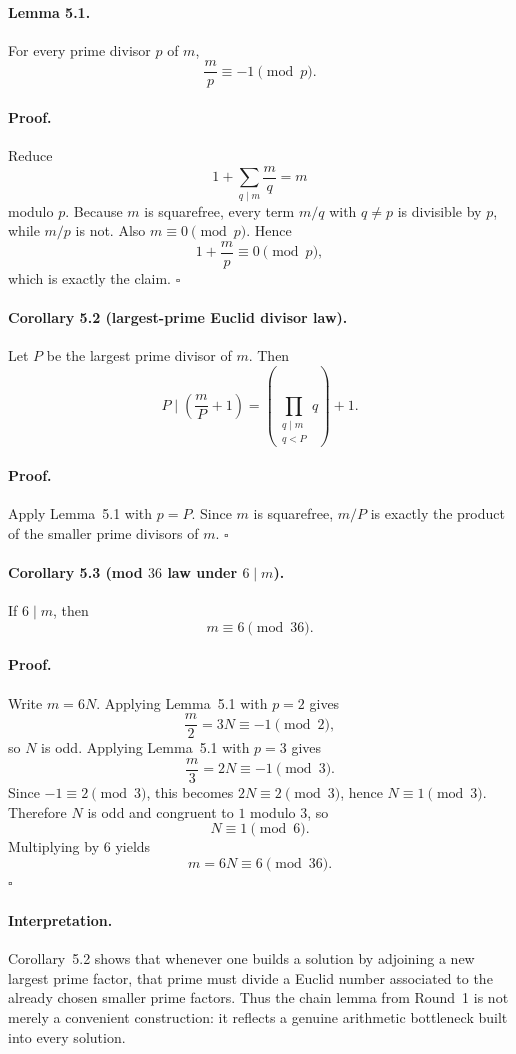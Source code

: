 \paragraph{Lemma 5.1.}
For every prime divisor $p$ of $m$,
\[
\frac{m}{p}\equiv -1 \pmod p.
\]

\paragraph{Proof.}
Reduce
\[
1+\sum_{q\mid m}\frac{m}{q}=m
\]
modulo $p$.  Because $m$ is squarefree, every term $m/q$ with $q\neq p$ is divisible by $p$, while $m/p$ is not.  Also $m\equiv 0\pmod p$.  Hence
\[
1+\frac{m}{p}\equiv 0 \pmod p,
\]
which is exactly the claim.  \hfill $\square$

\paragraph{Corollary 5.2 (largest-prime Euclid divisor law).}
Let $P$ be the largest prime divisor of $m$.  Then
\[
P\mid \left(\frac{m}{P}+1\right)=\left(\prod_{\substack{q\mid m \\ q<P}} q\right)+1.
\]

\paragraph{Proof.}
Apply Lemma~5.1 with $p=P$.  Since $m$ is squarefree, $m/P$ is exactly the product of the smaller prime divisors of $m$.  \hfill $\square$

\paragraph{Corollary 5.3 (mod $36$ law under $6\mid m$).}
If $6\mid m$, then
\[
m\equiv 6 \pmod{36}.
\]

\paragraph{Proof.}
Write $m=6N$.
Applying Lemma~5.1 with $p=2$ gives
\[
\frac{m}{2}=3N\equiv -1 \pmod 2,
\]
so $N$ is odd.
Applying Lemma~5.1 with $p=3$ gives
\[
\frac{m}{3}=2N\equiv -1 \pmod 3.
\]
Since $-1\equiv 2\pmod 3$, this becomes $2N\equiv 2\pmod 3$, hence $N\equiv 1\pmod 3$.
Therefore $N$ is odd and congruent to $1$ modulo $3$, so
\[
N\equiv 1 \pmod 6.
\]
Multiplying by $6$ yields
\[
m=6N\equiv 6 \pmod{36}.
\]
\hfill $\square$

\paragraph{Interpretation.}
Corollary~5.2 shows that whenever one builds a solution by adjoining a new largest prime factor, that prime must divide a Euclid number associated to the already chosen smaller prime factors.  Thus the chain lemma from Round~1 is not merely a convenient construction: it reflects a genuine arithmetic bottleneck built into every solution.

